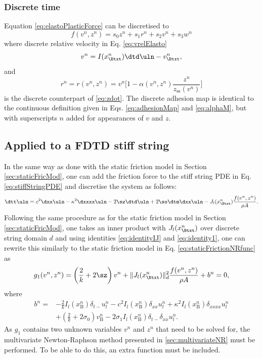\subsubsection{Discrete time}
Equation \eqref{eq:elastoPlasticForce} can be discretised to
\begin{equation}\label{eq:discForceFunction}
    f(v^n,z^n) = s_0z^n + s_1r^n+s_2v^n+s_3w^n
\end{equation} 
where discrete relative velocity in Eq. \eqref{eq:vrelElasto}
\begin{equation}\label{eq:vrelElastoDisc}
    v^n = I(x_\Btxt^n)\dtd\uln - v_\Btxt^n,
\end{equation}
and 
\begin{equation}\label{eq:r}
    r^n = r(v^n,z^n) = v^n\bigg[1-\alpha(v^n,z^n)\frac{z^n}{z_\text{ss}(v^n)}\bigg]
\end{equation}
is the discrete counterpart of \eqref{eq:zdot}. The discrete adhesion map is identical to the continuous definition given in Eqs. \eqref{eq:adhesionMap} and \eqref{eq:alphaM}, but with superscripts $n$ added for appearances of $v$ and $z$.

\subsection{Applied to a FDTD stiff string}

In the same way as done with the static friction model in Section \ref{sec:staticFricMod}, one can add the friction force to the stiff string PDE in Eq. \eqref{eq:stiffStringPDE} and discretise the system as follows:
%
\begin{equation}\label{eq:elastoStiffStringFDS}
    \dtt \uln = c^2 \dxx \uln - \kappa^2 \dxxxx \uln - 2 \sz \dtd \uln + 2 \so\dtm\dxx \uln - J_l(x_\Btxt^n)\frac{f(v^n,z^n)}{\rho A}.
\end{equation}
Following the same procedure as for the static friction model in Section \ref{sec:staticFricMod}, one takes an inner product with $J_l(x_\Btxt^n)$ over discrete string domain $d$ and using identities \eqref{eq:identityIJ} and \eqref{eq:identity1}, one can rewrite this similarly to the static friction model in Eq. \eqref{eq:staticFrictionNRfunc} as
%
\begin{equation}
    g_1(v^n,z^n) = \left(\frac{2}{k} + 2\sz\right)v^n + \lVert J_l(x_\Btxt^n)\rVert_d^2\frac{f(v^n,z^n)}{\rho A}+ b^n= 0,
\end{equation}
where
\begin{align*}
    b^n =&-\frac{2}{k}I_l(x_\text{B}^n)\delta_{t-}u_l^n - c^2 I_l(x_\text{B}^n)\delta_{xx} u_l^n +\kappa^2I_l(x_\text{B}^n)\delta_{xxxx} u_l^n\\
    &+\left(\frac{2}{k}+ 2\sigma_0\right)v_\text{B}^n-2\sigma_1I_l(x_\text{B}^n)\delta_{t-}\delta_{xx}u_l^n.
\end{align*}
As $g_1$ contains two unknown variables $v^n$ and $z^n$ that need to be solved for, the multivariate Newton-Raphson method presented in \ref{sec:multivariateNR} must be performed. To be able to do this, an extra function must be included. 

